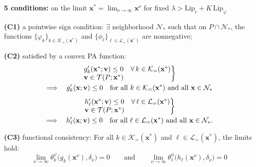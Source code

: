 \documentclass[aspectratio=169,xcolor=dvipsnames]{beamer}
\begin{document}
\begin{frame}
  \footnotesize
  \setlength{\abovedisplayskip}{3pt}
  \setlength{\belowdisplayskip}{3pt}

  \textbf{5 conditions:} on the limit
  $\mathbf{x}^*=\displaystyle\lim_{\nu\to\infty}\mathbf{x}^\nu$ for fixed
  $\lambda>\mathrm{Lip}_c+K\,\mathrm{Lip}_\varphi$

  \vspace{0.13cm}
  \textbf{(C1)} \textcolor{MediumRed}{a pointwise sign condition:}
  $\exists$ neighborhood $\mathcal{N}_*$ such that on
  $P\cap\mathcal{N}_*$, the functions
  $\{\varphi_k\}_{k\in\mathcal{K}_=(\mathbf{x}^*)}$ and
  $\{\phi_\ell\}_{\ell\in\mathcal{L}_=(\mathbf{x}^*)}$ are nonnegative;

  \vspace{0.13cm}
  \textbf{(C2)} \textcolor{MediumRed}{satisfied by a convex PA function:}
  \[
    \begin{gathered}
      \left.
      \begin{array}{@{}c@{\quad}l@{}}
        g_k'(\mathbf{x}^*;\mathbf{v})\leq 0
          & \forall\,k\in\mathcal{K}_=(\mathbf{x}^*)\\
        \mathbf{v}\in\mathcal{T}(P;\mathbf{x}^*) &
      \end{array}
      \right\}\\[-1pt]
      \Longrightarrow\quad g_k'(\mathbf{x};\mathbf{v})\leq 0
        \quad\text{for all }k\in\mathcal{K}_=(\mathbf{x}^*)
        \text{ and all }\mathbf{x}\in\mathcal{N}_*\\[4pt]
      \left.
      \begin{array}{@{}c@{\quad}l@{}}
        h_\ell'(\mathbf{x}^*;\mathbf{v})\leq 0
          & \forall\,\ell\in\mathcal{L}_=(\mathbf{x}^*)\\
        \mathbf{v}\in\mathcal{T}(P;\mathbf{x}^*) &
      \end{array}
      \right\}\\[-1pt]
      \Longrightarrow\quad h_\ell'(\mathbf{x};\mathbf{v})\leq 0
        \quad\text{for all }\ell\in\mathcal{L}_=(\mathbf{x}^*)
        \text{ and all }\mathbf{x}\in\mathcal{N}_*.
    \end{gathered}
  \]

  \vspace{0.06cm}
  \textbf{(C3)} \textcolor{MediumRed}{functional consistency:} For all
  $k\in\mathcal{K}_=(\mathbf{x}^*)$ and
  $\ell\in\mathcal{L}_=(\mathbf{x}^*)$, the limits hold:
  \[
    \lim_{\nu\to\infty}
      \theta_k^\varphi\bigl(g_k(\mathbf{x}^\nu),\delta_\nu\bigr)=0
    \qquad\text{and}\qquad
    \lim_{\nu\to\infty}
      \theta_\ell^\phi\bigl(h_\ell(\mathbf{x}^\nu),\delta_\nu\bigr)=0
  \]
\end{frame}
\end{document}
